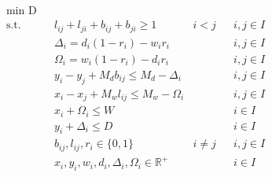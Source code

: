 \begin{align}
	& \underset{}{\text{min D}}\\
	  & \text{s.t.} &   & l_{ij} + l_{ji} + b_{ij} + b_{ji} \geq 1                              & i < j    &   & i,j \in I \label{equa21} \\
	  &             &   & \Delta_i = d_i (1 - r_i) - w_i r_i                                    &          &   & i,j \in I \label{equa22} \\
	  &             &   & \Omega_i = w_i (1 - r_i) - d_i r_i                                    &          &   & i,j \in I \label{equa23} \\
	  &             &   & y_i - y_j + M_d b_{ij} \leq M_d - \Delta_i                            &          &   & i,j \in I \label{equa24} \\
	  &             &   & x_i - x_j + M_w l_{ij} \leq M_w - \Omega_i                            &          &   & i,j \in I \label{equa25} \\
	  &             &   & x_i + \Omega_i \leq W                                                 &          &   & i \in I   \label{equa26} \\
	  &             &   & y_i + \Delta_i \leq D                                                 &          &   & i \in I   \label{equa27} \\
	  &             &   & b_{ij}, l_{ij}, r_i \in \{0,1\}                                       & i \neq j &   & i,j \in I \label{equa28} \\
	  &             &   & x_{i}, y_{i}, w_{i}, d_{i}, \Delta_{i}, \Omega_{i} \in \mathbb{R}^{+} &          &   & i \in I  \label{equa29}  
\end{align}


